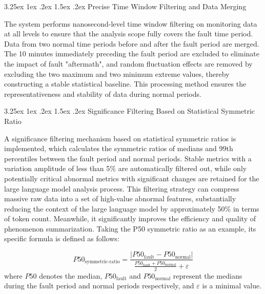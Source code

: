 \documentclass[10pt]{article}
\makeatletter
\renewcommand{\paragraph}{%
    \@startsection{paragraph}{4}{\z@}%
    {3.25ex \@plus1ex \@minus.2ex}%
    {1.5ex \@plus.2ex}%
    {\normalfont\normalsize\itshape}%
}
\makeatother
\begin{document}
\paragraph{Precise Time Window Filtering and Data Merging}

The system performs nanosecond-level time window filtering on monitoring data at all levels to ensure that the analysis scope fully covers the fault time period. Data from two normal time periods before and after the fault period are merged. The 10 minutes immediately preceding the fault period are excluded to eliminate the impact of fault "aftermath", and random fluctuation effects are removed by excluding the two maximum and two minimum extreme values, thereby constructing a stable statistical baseline. This processing method ensures the representativeness and stability of data during normal periods.

\paragraph{Significance Filtering Based on Statistical Symmetric Ratio}

A significance filtering mechanism based on statistical symmetric ratios is implemented, which calculates the symmetric ratios of medians and 99th percentiles between the fault period and normal periods. Stable metrics with a variation amplitude of less than 5\% are automatically filtered out, while only potentially critical abnormal metrics with significant changes are retained for the large language model analysis process. This filtering strategy can compress massive raw data into a set of high-value abnormal features, substantially reducing the context of the large language model by approximately 50\% in terms of token count. Meanwhile, it significantly improves the efficiency and quality of phenomenon summarization. Taking the P50 symmetric ratio as an example, its specific formula is defined as follows:

\begin{equation}
P50_{\mathrm{symmetric\text{-}ratio}} = \frac{ \left| P50_{\mathrm{fault}} - P50_{\mathrm{normal}} \right| }{ \frac{ P50_{\mathrm{fault}} + P50_{\mathrm{normal}} }{2} + \varepsilon }
\end{equation}
where $P50$ denotes the median, $P50_{\mathrm{fault}}$ and $P50_{\mathrm{normal}}$ represent the medians during the fault period and normal periods respectively, and $\varepsilon$ is a minimal value.
\end{document}
